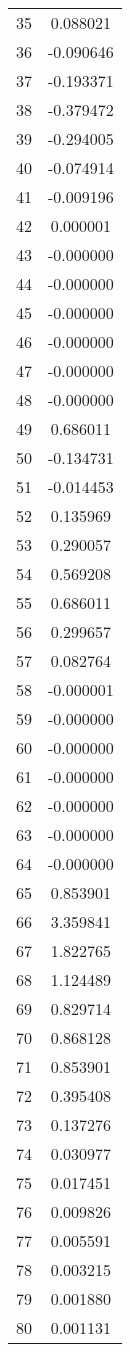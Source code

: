 \documentclass[12pt]{article}
\begin{document}
\begin{longtable}{@{}cc@{}}
35 & 0.088021 \\
36 & -0.090646 \\
37 & -0.193371 \\
38 & -0.379472 \\
39 & -0.294005 \\
40 & -0.074914 \\
41 & -0.009196 \\
42 & 0.000001 \\
43 & -0.000000 \\
44 & -0.000000 \\
45 & -0.000000 \\
46 & -0.000000 \\
47 & -0.000000 \\
48 & -0.000000 \\
49 & 0.686011 \\
50 & -0.134731 \\
51 & -0.014453 \\
52 & 0.135969 \\
53 & 0.290057 \\
54 & 0.569208 \\
55 & 0.686011 \\
56 & 0.299657 \\
57 & 0.082764 \\
58 & -0.000001 \\
59 & -0.000000 \\
60 & -0.000000 \\
61 & -0.000000 \\
62 & -0.000000 \\
63 & -0.000000 \\
64 & -0.000000 \\
65 & 0.853901 \\
66 & 3.359841 \\
67 & 1.822765 \\
68 & 1.124489 \\
69 & 0.829714 \\
70 & 0.868128 \\
71 & 0.853901 \\
72 & 0.395408 \\
73 & 0.137276 \\
74 & 0.030977 \\
75 & 0.017451 \\
76 & 0.009826 \\
77 & 0.005591 \\
78 & 0.003215 \\
79 & 0.001880 \\
80 & 0.001131 \\

\end{longtable}
\end{document}
